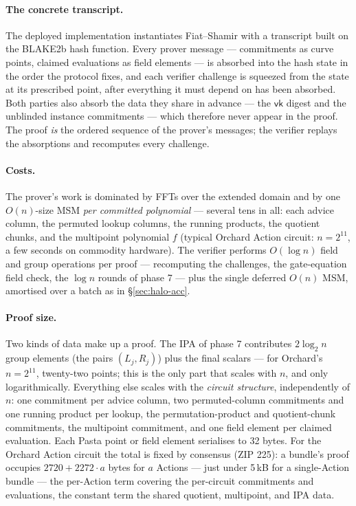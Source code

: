 \documentclass[11pt,a4paper]{article}
\theoremstyle{definition}
\begin{document}
\paragraph{The concrete transcript.}
The deployed implementation instantiates Fiat--Shamir with a transcript
built on the BLAKE2b hash function. Every prover message ---
commitments as curve points, claimed evaluations as field elements --- is
absorbed into the hash state in the order the protocol fixes, and each
verifier challenge is squeezed from the state at its prescribed point,
after everything it must depend on has been absorbed. Both parties also
absorb the data they share in advance --- the $\mathsf{vk}$ digest and
the unblinded instance commitments --- which therefore never appear in
the proof. The proof \emph{is} the ordered sequence of the prover's
messages; the verifier replays the absorptions and recomputes every
challenge.

\paragraph{Costs.}
The prover's work is dominated by FFTs over the extended domain and by
one $O(n)$-size MSM \emph{per committed polynomial} --- several tens in
all: each advice column, the permuted lookup columns, the running
products, the quotient chunks, and the multipoint polynomial $f$
(typical Orchard Action circuit: $n = 2^{11}$, a few seconds on commodity
hardware). The verifier performs $O(\log n)$ field and group operations
per proof --- recomputing the challenges, the gate-equation field check,
the $\log n$ rounds of phase 7 --- plus the single deferred $O(n)$ MSM,
amortised over a batch as in \S\ref{sec:halo-acc}.

\paragraph{Proof size.}
Two kinds of data make up a proof. The IPA of phase 7 contributes
$2 \log_2 n$ group elements (the pairs $(L_j, R_j)$) plus the final
scalars --- for Orchard's $n = 2^{11}$, twenty-two points; this is the
only part that scales with $n$, and only logarithmically. Everything
else scales with the \emph{circuit structure}, independently of $n$: one
commitment per advice column, two permuted-column commitments and one
running product per lookup, the permutation-product and quotient-chunk
commitments, the multipoint commitment, and one field element per claimed
evaluation. Each Pasta point or field element serialises to 32 bytes.
For the Orchard Action circuit the total is fixed by consensus (ZIP 225):
a bundle's proof occupies $2720 + 2272 \cdot a$ bytes for $a$ Actions ---
just under 5\,kB for a single-Action bundle --- the per-Action term
covering the per-circuit commitments and evaluations, the constant term
the shared quotient, multipoint, and IPA data.
\end{document}
